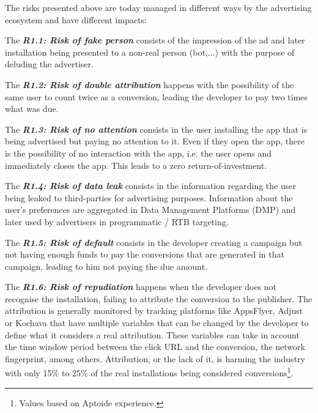 The risks presented above are today managed in different ways by the advertising ecosystem and have different impacts:

\begin{tcolorbox}[enhanced jigsaw,sharp corners, drop fuzzy shadow=ShadowColor]

The {\bf\em R1.1: Risk of fake person} consists of the impression of the ad and later installation being presented to a non-real person (bot,...) with the purpose of deluding the advertiser. 


The {\bf\em R1.2: Risk of double attribution} happens with the possibility of the same user to count twice as a conversion, leading the developer to pay two times what was due.


The {\bf\em R1.3: Risk of no attention} consists in the user installing the app that is being advertised but paying no attention to it. Even if they open the app, there is the possibility of no interaction with the app, i.e. the user opens and immediately closes the app. This leads to a zero return-of-investment.


The {\bf\em R1.4: Risk of data leak} consists in the information regarding the user being leaked to third-parties for advertising purposes. Information about the user's preferences are aggregated in Data Management Platforms (DMP) and later used by advertisers in programmatic / RTB targeting. 

The {\bf\em R1.5: Risk of default} consists in the developer creating a campaign but not having enough funds to pay the conversions that are generated in that campaign, leading to him not paying the due amount.


The {\bf\em R1.6: Risk of repudiation} happens when the developer does not recognise the installation, failing to attribute the conversion to the publisher. The attribution is generally monitored by tracking platforms like AppsFlyer, Adjust or Kochava that have multiple variables that can be changed by the developer to define what it considers a real attribution. These variables can take in account the time window period between the click URL and the conversion, the network fingerprint, among others. Attribution, or the lack of it, is harming the industry with only 15\% to 25\% of the real installations being considered conversions\footnote{Values based on Aptoide experience.}.


\end{tcolorbox}


